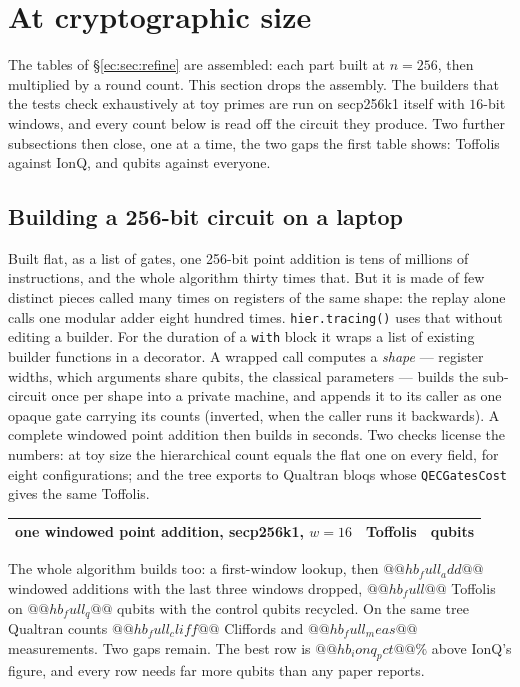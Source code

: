 \section{At cryptographic size}\label{ec:sec:n256}

The tables of \S\ref{ec:sec:refine} are assembled: each part built at $n=256$, then multiplied by a
round count. This section drops the assembly. The builders that the tests check exhaustively at
toy primes are run on secp256k1 itself with $16$-bit windows, and every count below is read off
the circuit they produce. Two further subsections then close, one at a time, the two gaps the
first table shows: Toffolis against IonQ, and qubits against everyone.

\subsection{Building a 256-bit circuit on a laptop}

Built flat, as a list of gates, one 256-bit point addition is tens of millions of instructions,
and the whole algorithm thirty times that. But it is made of few distinct pieces called many times
on registers of the same shape: the replay alone calls one modular adder eight hundred times.
\texttt{hier.tracing()} uses that without editing a builder. For the duration of a \texttt{with}
block it wraps a list of existing builder functions in a decorator. A wrapped call computes a
\emph{shape} --- register widths, which arguments share qubits, the classical parameters --- builds
the sub-circuit once per shape into a private machine, and appends it to its caller as one opaque
gate carrying its counts (inverted, when the caller runs it backwards). A complete windowed point
addition then builds in seconds. Two checks license the numbers: at toy size the hierarchical count
equals the flat one on every field, for eight configurations; and the tree exports to Qualtran
bloqs whose \texttt{QECGatesCost} gives the same Toffolis.

\begin{center}\small
\begin{tabular}{lrr}
\toprule
one windowed point addition, secp256k1, $w=16$ & Toffolis & qubits\\
\midrule
\bottomrule
\end{tabular}
\end{center}

The whole algorithm builds too: a first-window lookup, then $@@hb_full_add@@$ windowed additions
with the last three windows dropped, $@@hb_full@@$ Toffolis on $@@hb_full_q@@$ qubits with the
control qubits recycled. On the same tree Qualtran counts $@@hb_full_cliff@@$ Cliffords and
$@@hb_full_meas@@$ measurements. Two gaps remain. The best row is $@@hb_ionq_pct@@\%$ above IonQ's
figure, and every row needs far more qubits than any paper reports.

